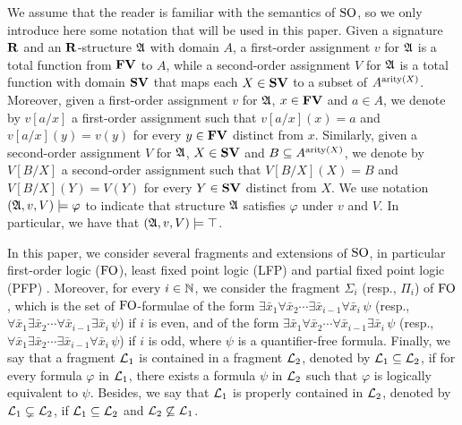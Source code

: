 We assume that the reader is familiar with the semantics of ${\rm SO}$, so we only introduce here some notation that will be used in this paper. 
Given a signature $\mathbf{R}$ and an $\mathbf{R}$-structure $\mathfrak{A}$ with domain $A$, a first-order assignment $v$ for $\mathfrak{A}$ is a total function from $\mathbf{FV}$ to $A$, while a second-order assignment $V$ for $\mathfrak{A}$ is a total function with domain $\mathbf{SV}$ that maps each $X \in \mathbf{SV}$ to a subset of $A^{{\rm arity}(X)}$. Moreover, given a first-order assignment $v$ for $\mathfrak{A}$, $x \in \mathbf{FV}$ and $a \in A$, we denote by $v[a/x]$ a first-order assignment such that $v[a/x](x) = a$ and $v[a/x](y) = v(y)$ for every $y \in \mathbf{FV}$ distinct from $x$. Similarly, given a second-order assignment $V$ for $\mathfrak{A}$, $X \in \mathbf{SV}$ and $B  \subseteq A^{{\rm arity}(X)}$, we denote by $V[B/X]$ a second-order assignment such that $V[B/X](X) = B$ and $V[B/X](Y) = V(Y)$ for every $Y \in \mathbf{SV}$ distinct from $X$. We use notation $(\mathfrak{A}, v, V) \models \varphi$ to indicate that structure $\mathfrak{A}$ satisfies $\varphi$ under $v$ and $V$. In particular, we have that $(\mathfrak{A}, v, V) \models \top$.

In this paper, we consider several fragments and extensions of ${\rm SO}$, in particular first-order logic (${\rm FO}$), least fixed point logic (LFP) and partial fixed point logic (PFP) \cite{L04}. Moreover, for every $i \in \mathbb{N}$, we consider the fragment $\Sigma_i$ (resp., $\Pi_i$) of ${\rm FO}$, which is the set of ${\rm FO}$-formulae of the form 
$\exists \bar x_1 \forall \bar x_2 \cdots \exists \bar x_{i-1} \forall \bar x_{i} \, \psi$ (resp., 
$\forall \bar x_1 \exists \bar x_2 \cdots \forall \bar x_{i-1} \exists \bar x_{i} \, \psi$) if $i$ is even, and of the form
$\exists \bar x_1 \forall \bar x_2 \cdots \forall \bar x_{i-1} \exists \bar x_{i} \, \psi$ (resp., 
$\forall \bar x_1 \exists \bar x_2 \cdots \exists \bar x_{i-1} \forall \bar x_{i} \, \psi$) if $i$ is odd, where $\psi$ is a quantifier-free formula. Finally, we say that a fragment $\mathcal{L}_1$ is contained in a fragment $\mathcal{L}_2$, denoted by $\mathcal{L}_1 \subseteq \mathcal{L}_2$, if for every formula $\varphi$ in $\mathcal{L}_1$, there exists a formula $\psi$ in $\mathcal{L}_2$ such that $\varphi$ is logically equivalent to $\psi$.  Besides, we say that $\mathcal{L}_1$ is properly contained in $\mathcal{L}_2$, denoted by $\mathcal{L}_1 \subsetneq \mathcal{L}_2$, if $\mathcal{L}_1 \subseteq \mathcal{L}_2$ and $\mathcal{L}_2 \not\subseteq \mathcal{L}_1$.


